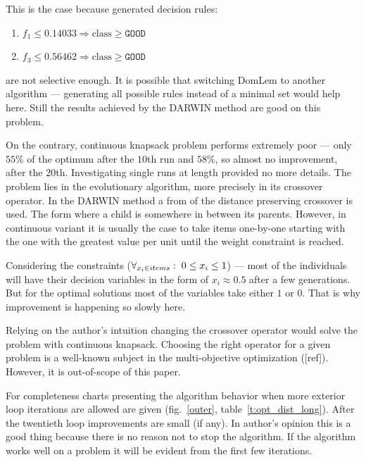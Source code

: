 This is the case because generated decision rules:
\begin{enumerate}
\item $f_1 \le 0.14033 \Rightarrow \text{class} \ge \texttt{GOOD}$
\item $f_3 \le 0.56462 \Rightarrow \text{class} \ge \texttt{GOOD}$
\end{enumerate}
are not selective enough. It is possible that switching DomLem to another
algorithm --- generating all possible rules instead of a minimal set would
help here. Still the results achieved by the DARWIN method are good on this
problem.

On the contrary, continuous knapsack problem performs extremely poor --- only
$55\%$ of the optimum after the $10$th run and $58\%$, so almost no
improvement, after the $20$th. Investigating single runs at length provided no
more details. The problem lies in the evolutionary algorithm, more precisely
in its crossover operator. In the DARWIN method a from of the distance
preserving crossover is used. The form where a child is somewhere in between
its parents. However, in continuous variant it is usually the case to take
items one-by-one starting with the one with the greatest value per unit until
the weight constraint is reached.

Considering the constraints ($ \forall_{x_i \in items}: \hspace{0.1cm} 0 \leq
x_i \leq 1 $) --- most of the individuals will have their decision variables
in the form of $x_i \approx 0.5$ after a few generations. But for the optimal
solutions most of the variables take either $1$ or $0$. That is why
improvement is happening so slowly here.

Relying on the author's intuition changing the crossover operator would solve
the problem with continuous knapsack. Choosing the right operator for a given
problem is a well-known subject in the multi-objective optimization
([ref]). However, it is out-of-scope of this paper.

For completeness charts presenting the algorithm behavior when more exterior
loop iterations are allowed are given (fig.~\ref{outer},
table~\ref{t:opt_dist_long}). After the twentieth loop improvements are small
(if any). In author's opinion this is a good thing because there is no reason
not to stop the algorithm. If the algorithm works well on a problem it will be
evident from the first few iterations.

